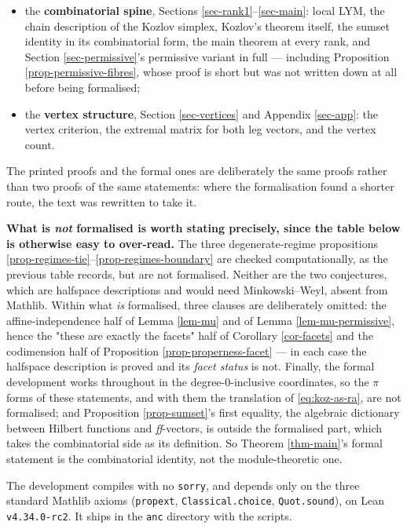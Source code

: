 \documentclass[11pt, a4paper, abstract=yes]{scrartcl}
\theoremstyle{definition}
\theoremstyle{remark}
\theoremstyle{plain}
\newcommand{\proj}{\pi}
\begin{document}
\begin{itemize}
\item the \textbf{combinatorial spine}, Sections \ref{sec-rank1}--\ref{sec-main}: local LYM, the chain description
of the Kozlov simplex, Kozlov's theorem itself, the sumset identity in its combinatorial form, the
main theorem at every rank, and Section \ref{sec-permissive}'s permissive variant in full ---
including Proposition \ref{prop-permissive-fibres}, whose proof is short but was not written down at
all before being formalised;
\item the \textbf{vertex structure}, Section \ref{sec-vertices} and Appendix \ref{sec-app}: the vertex criterion,
the extremal matrix for both leg vectors, and the vertex count.
\end{itemize}

The printed proofs and the formal ones are deliberately the same proofs rather than two proofs of the
same statements: where the formalisation found a shorter route, the text was rewritten to take it.

\textbf{\textbf{What is \emph{not} formalised is worth stating precisely, since the table below is otherwise easy to
over-read.}} The three degenerate-regime propositions
\ref{prop-regimes-tie}--\ref{prop-regimes-boundary} are checked computationally, as the previous table
records, but are not formalised. Neither are the two conjectures, which are halfspace descriptions
and would need Minkowski--Weyl, absent from Mathlib. Within what \emph{is} formalised, three clauses are
deliberately omitted: the affine-independence half of Lemma \ref{lem-mu} and of
Lemma \ref{lem-mu-permissive}, hence the "these are exactly the facets" half of
Corollary \ref{cor-facets} and the codimension half of Proposition \ref{prop-properness-facet} --- in
each case the halfspace description is proved and its \emph{facet status} is not. Finally, the formal
development works throughout in the degree-\(0\)-inclusive coordinates, so the \(\proj\) forms of
these statements, and with them the translation of \eqref{eq:koz-as-ra}, are not formalised; and
Proposition \ref{prop-sumset}'s first equality, the algebraic dictionary between Hilbert functions and
\emph{ff}-vectors, is outside the formalised part, which takes the combinatorial side as its definition.
So Theorem \ref{thm-main}'s formal statement is the combinatorial identity, not the module-theoretic
one.

The development compiles with no \texttt{sorry}, and depends only on the three standard Mathlib axioms
(\texttt{propext}, \texttt{Classical.choice}, \texttt{Quot.sound}), on Lean \texttt{v4.34.0-rc2}. It ships in the \texttt{anc}
directory with the scripts.
\end{document}
